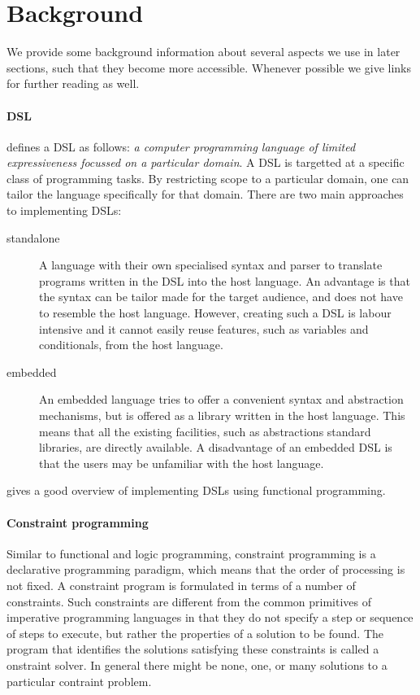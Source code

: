 \section{Background}
\label{sec:background}

We provide some background information about several aspects we use in
later sections, such that they become more accessible.
%
Whenever possible we give links for further reading as well.

\paragraph{\acl{DSL}} \citet{fowler} defines a \ac{DSL} as follows:
%
\emph{a computer programming language of limited expressiveness
  focussed on a particular domain}.
%
A \ac{DSL} is targetted at a specific class of programming tasks.
%
By restricting scope to a particular domain, one can tailor the
language specifically for that domain.
%
There are two main approaches to implementing \acp{DSL}:
\begin{description}
\item[standalone] A language with their own specialised syntax and
  parser to translate programs written in the \ac{DSL} into the host
  language.
%
  An advantage is that the syntax can be tailor made for the target
  audience, and does not have to resemble the host language.
%
  However, creating such a \ac{DSL} is labour intensive and it cannot
  easily reuse features, such as variables and conditionals, from the
  host language.
\item[embedded] An embedded language tries to offer a convenient
  syntax and abstraction mechanisms, but is offered as a library
  written in the host language.
%
  This means that all the existing facilities, such as abstractions
  standard libraries, are directly available.
%
  A disadvantage of an embedded \ac{DSL} is that the users may be
  unfamiliar with the host language.
\end{description}
\citet{Gibbons2015} gives a good overview of implementing \acp{DSL}
using functional programming.


\paragraph{Constraint programming} Similar to functional and logic
programming, constraint programming is a declarative programming
paradigm, which means that the order of processing is not fixed.
%
A constraint program is formulated in terms of a number of
constraints.
%
Such constraints are different from the common primitives of
imperative programming languages in that they do not specify a step or
sequence of steps to execute, but rather the properties of a solution
to be found.
%
The program that identifies the solutions satisfying these constraints
is called a onstraint solver.
%
In general there might be none, one, or many solutions to a particular
contraint problem.


